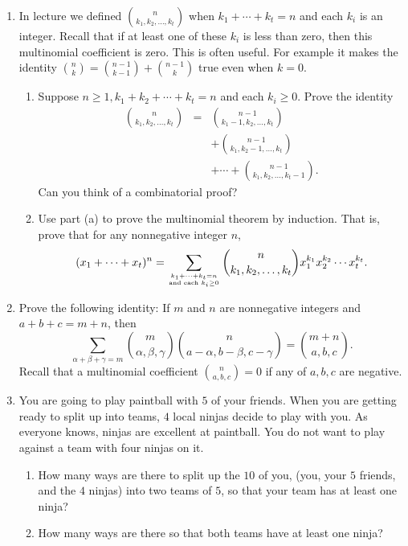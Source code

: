 \documentclass[11pt]{article}
\begin{document}
\begin{enumerate}
\begin{enumerate}
{\bf Hint}: In lecture we proved a similar identity by letting $x=1$ and $y= \sqrt{-1}$ in the Binomial Theorem.  What happens when you try something similar using each of the three complex solutions to $z^3 = 1$?

\end{enumerate}



\item In lecture we defined $\binom{n}{k_1,k_2, \ldots, k_t}$ when $k_1+\cdots + k_t = n$ and each $k_i$ is an integer.  Recall that if at least one of these $k_i$ is less than zero, then this multinomial coefficient is zero.  This is often useful.  For example it makes the identity $\binom{n}{k} = \binom{n-1}{k-1} + \binom{n-1}{k}$ true even when $k=0$.

\begin{enumerate}
\item Suppose $n \ge 1, k_1+k_2+\cdots +k_t = n$ and each $k_i \ge 0$.  Prove the identity
\begin{eqnarray*}
\binom{n}{k_1,k_2, \ldots, k_t}  & = & \binom{n-1}{k_1-1,k_2, \ldots, k_t} \\
&  & +  \binom{n-1}{k_1,k_2-1, \ldots, k_t} \\
&  & + \cdots +  \binom{n-1}{k_1,k_2, \ldots, k_t-1}.
\end{eqnarray*}
Can you think of a combinatorial proof?

\item Use part (a) to prove the multinomial theorem by induction.  That is, prove that for any nonnegative integer $n$,
\[
(x_1 + \cdots + x_t)^n = \sum_{k_1+\cdots + k_t = n \atop \text{and each } k_i \ge 0} \binom{n}{k_1,k_2, \ldots, k_t} x_1^{k_1} x_2^{k_2}\cdots x_t^{k_t}.
\]

\end{enumerate}

\item Prove the following identity: If $m$ and $n$ are nonnegative integers and $a+b+c = m+n$, then
\[
\sum_{\alpha+\beta+\gamma = m} \binom{m}{\alpha, \beta, \gamma} \binom{n}{a-\alpha, b - \beta, c- \gamma} = \binom{m+n}{a,b,c}.
\]
Recall that a multinomial coefficient $\binom{n}{a,b,c} = 0$ if any of $a,b,c$ are negative.




\item You are going to play paintball with $5$ of your friends.  When you are getting ready to split up into teams, $4$ local ninjas decide to play with you.  As everyone knows, ninjas are excellent at paintball.  You do not want to play against a team with four ninjas on it.  
\begin{enumerate}
\item How many ways are there to split up the $10$ of you, (you, your $5$ friends, and the $4$ ninjas)  into two teams of $5$, so that your team has at least one ninja?  
\item How many ways are there so that both teams have at least one ninja?
\end{enumerate}


\end{enumerate}
\end{document}
